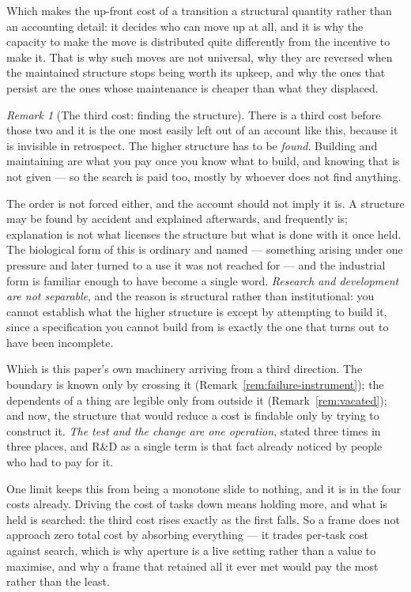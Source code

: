 \documentclass[11pt,a4paper]{article}
\theoremstyle{remark}\newtheorem{remark}[definition]{Remark}
\begin{document}
Which makes the up-front cost of a transition a structural quantity rather than an accounting detail: it
decides who can move up at all, and it is why the capacity to make the move is distributed quite
differently from the incentive to make it. That is why such moves are not universal, why they are reversed when
the maintained structure stops being worth its upkeep, and why the ones that persist are the ones whose
maintenance is cheaper than what they displaced.

\begin{remark}[The third cost: finding the structure]\label{rem:third-cost}
There is a third cost before those two and it is the one most easily left out of an account like this,
because it is invisible in retrospect. The higher structure has to be \emph{found}. Building and
maintaining are what you pay once you know what to build, and knowing that is not given --- so the
search is paid too, mostly by whoever does not find anything.

The order is not forced either, and the account should not imply it is. A structure may be found by
accident and explained afterwards, and frequently is; explanation is not what licenses the structure but
what is done with it once held. The biological form of this is ordinary and named --- something arising
under one pressure and later turned to a use it was not reached for --- and the industrial form is
familiar enough to have become a single word. \emph{Research and development are not separable}, and
the reason is structural rather than institutional: you cannot establish what the higher structure is
except by attempting to build it, since a specification you cannot build from is exactly the one that
turns out to have been incomplete.

Which is this paper's own machinery arriving from a third direction. The boundary is known only by
crossing it (Remark~\ref{rem:failure-instrument}); the dependents of a thing are legible only from
outside it (Remark~\ref{rem:vacated}); and now, the structure that would reduce a cost is findable only
by trying to construct it. \emph{The test and the change are one operation}, stated three times in three
places, and R\&D as a single term is that fact already noticed by people who had to pay for it.

One limit keeps this from being a monotone slide to nothing, and it is in the four costs already. Driving
the cost of tasks down means holding more, and what is held is searched: the third cost rises exactly as
the first falls. So a frame does not approach zero total cost by absorbing everything --- it trades
per-task cost against search, which is why aperture is a live setting rather than a value to maximise,
and why a frame that retained all it ever met would pay the most rather than the least.
\end{remark}
\end{document}
